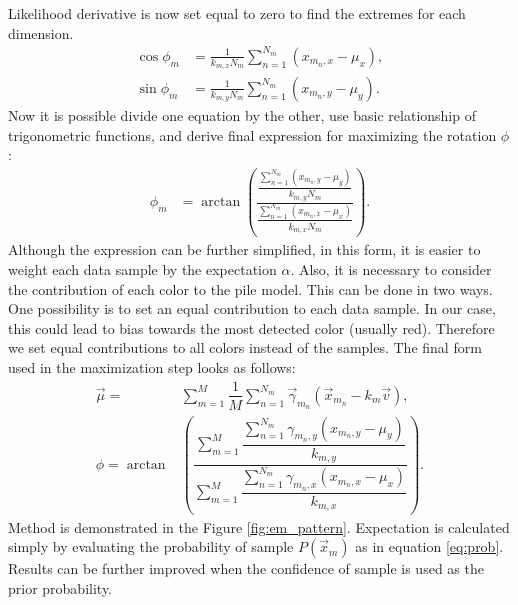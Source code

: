 Likelihood derivative is now set equal to zero to find the extremes for each dimension.
\begin{align}
\cos \phi_m &= \frac{1}{k_{m, x}N_m} \sum_{n = 1}^{N_m} \left(  x_{m_n, x} - \mu_x \right)  , \\ 
\sin \phi_m &=  \frac{1}{k_{m, y}N_m} \sum_{n = 1}^{N_m} \left(  x_{m_n, y} - \mu_y \right)  .
\end{align}
Now it is possible divide one equation by the other, use basic relationship of trigonometric functions, and derive final expression for maximizing the rotation $\phi$:
\begin{align}
\phi_m &= \arctan \left( \frac{\dfrac{\sum_{n = 1}^{N_m} \left( x_{m_n, y} - \mu_y \right)}{k_{m, y}N_m} }{ \dfrac{\sum_{n = 1}^{N_m} \left( x_{m_n, x} - \mu_x \right)}{k_{m, x}N_m} }\right).
\end{align}
Although the expression can be further simplified, in this form, it is easier to weight each data sample by the expectation $\alpha$. Also, it is necessary to consider the contribution of each color to the pile model. This can be done in two ways. One possibility is to set an equal contribution to each data sample. In our case, this could lead to bias towards the most detected color (usually red). Therefore we set equal contributions to all colors instead of the samples. The final form used in the maximization step looks as follows:
\begin{align}
\vec{\mu} =& \sum_{m=1}^M \dfrac{1}{M}\sum_{n = 1}^{N_m}  \vec{\gamma}_{m_n} \left( \vec{x}_{m_n} - k_m \vec{v} \right) , \\
\phi = \arctan & \left( \dfrac{\sum_{m=1}^{M} \dfrac{\sum_{n = 1}^{N_m} \gamma_{m_n, y}(x_{m_n, y} - \mu_y)}{k_{m, y} } }{\sum_{m=1}^{M} \dfrac{\sum_{n = 1}^{N_m} \gamma_{m_n, x} (x_{m_n, x} - \mu_x) }{k_{m, x}} }\right).
\end{align}
Method is demonstrated in the Figure \ref{fig:em_pattern}. Expectation is calculated simply by evaluating the probability of sample $P(\vec{x}_m)$ as in equation \ref{eq:prob}. Results can be further improved when the confidence of sample is used as the prior probability.


